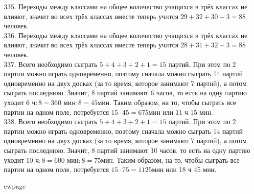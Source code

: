 335. Переходы между классами на общее количество учащихся в трёх классах не влияют, значит во всех трёх классах вместе теперь учится $29+32+30-3=88$ человек.\\
336. Переходы между классами на общее количество учащихся в трёх классах не влияют, значит во всех трёх классах вместе теперь учится $28+31+32-3=88$ человек.\\
337. Всего необходимо сыграть $5+4+3+2+1=15$ партий. При этом по 2 партии можно играть одновременно, поэтому сначала можно сыграть 14 партий одновременно на двух досках (за то время, которое занимают 7 партий), а потом сыграть последнюю. Значит, 8 партий занимают 6 часов, то есть на одну партию уходит $6\text{ ч}:8= 360\text{ мин}:8=45$мин. Таким образом, на то, чтобы сыграть все партии на одном поле, потребуется $15\cdot45=675$мин или 11 ч 15 мин.\\
338. Всего необходимо сыграть $5+4+3+2+1=15$ партий. При этом по 2 партии можно играть одновременно, поэтому сначала можно сыграть 14 партий одновременно на двух досках (за то время, которое занимают 7 партий), а потом сыграть последнюю. Значит, 8 партий занимают 10 часов, то есть на одну партию уходит $10\text{ ч}:8= 600\text{ мин}:8=75$мин. Таким образом, на то, чтобы сыграть все партии на одном поле, потребуется $15\cdot75=1125$мин или 18 ч 45 мин.

ewpage
